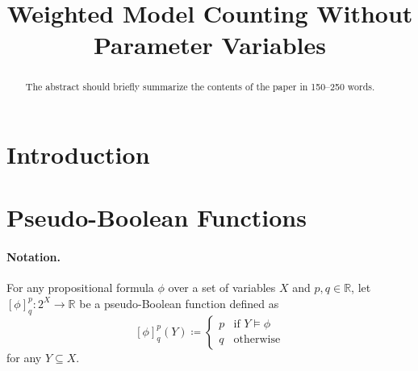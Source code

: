 \documentclass[runningheads]{llncs}
\begin{document}
\title{Weighted Model Counting Without Parameter Variables}





\maketitle              %

\begin{abstract}
  The abstract should briefly summarize the contents of the paper in
  150--250 words.

\end{abstract}

\section{Introduction}

\section{Pseudo-Boolean Functions}

\paragraph{Notation.} For any propositional formula $\phi$ over a set of
variables $X$ and $p, q \in \mathbb{R}$, let $[\phi]^p_q\colon 2^X \to
\mathbb{R}$ be a pseudo-Boolean function defined as
\[
  [\phi]^p_q(Y) \coloneqq
  \begin{cases}
    p & \text{if } Y \models \phi \\
    q & \text{otherwise}
  \end{cases}
\]
for any $Y \subseteq X$.
\end{document}
